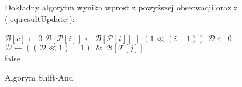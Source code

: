 Dokładny algorytm wynika wprost z powyższej obserwacji oraz z (\ref{eq:resultUpdate}):

\begin{algorithm}[h]
  \DontPrintSemicolon



   {
      $\mathcal{B}[c] \leftarrow 0$
  }
   {
      $
        \mathcal{B}[\mathcal{P}[i]] \leftarrow
          \mathcal{B}[\mathcal{P}[i]] \enspace | \enspace (1 \ll (i-1))
      $
  }
  $\mathcal{D} \leftarrow 0$ \\
   {
    $
      \mathcal{D} \leftarrow ((\mathcal{D} \ll 1 ) \enspace | \enspace 1)
        \enspace \& \enspace \mathcal{B}[\mathcal{T}[j]]
    $ \\
  }
  \Return false

  \caption{Algorym Shift-And}
  \label{alg-wiesniakow}
\end{algorithm}


